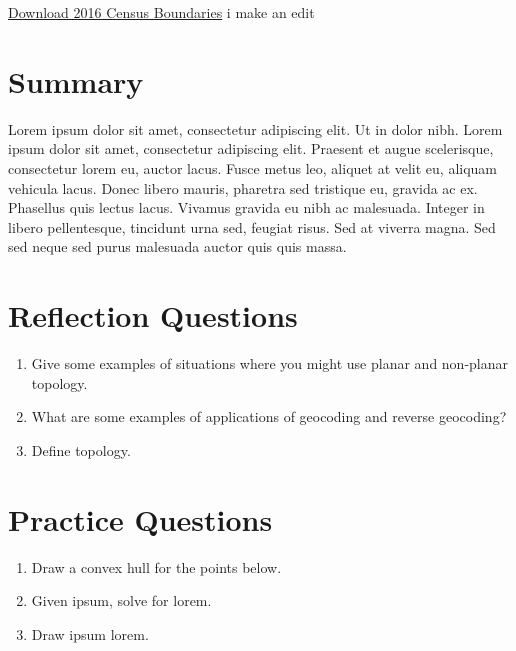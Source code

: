 \documentclass[
]{book}
\providecommand{\tightlist}{%
  \setlength{\itemsep}{0pt}\setlength{\parskip}{0pt}}
\begin{document}
\href{https://www12.statcan.gc.ca/census-recensement/2011/geo/bound-limit/bound-limit-2016-eng.cfm}{Download 2016 Census Boundaries} i make an edit

\hypertarget{summary-7}{%
\section{Summary}\label{summary-7}}

Lorem ipsum dolor sit amet, consectetur adipiscing elit. Ut in dolor nibh. Lorem ipsum dolor sit amet, consectetur adipiscing elit. Praesent et augue scelerisque, consectetur lorem eu, auctor lacus. Fusce metus leo, aliquet at velit eu, aliquam vehicula lacus. Donec libero mauris, pharetra sed tristique eu, gravida ac ex. Phasellus quis lectus lacus. Vivamus gravida eu nibh ac malesuada. Integer in libero pellentesque, tincidunt urna sed, feugiat risus. Sed at viverra magna. Sed sed neque sed purus malesuada auctor quis quis massa.

\hypertarget{reflection-questions-5}{%
\section*{Reflection Questions}\label{reflection-questions-5}}

\begin{enumerate}
\def\labelenumi{\arabic{enumi}.}
\tightlist
\item
  Give some examples of situations where you might use planar and non-planar topology.
\item
  What are some examples of applications of geocoding and reverse geocoding?
\item
  Define topology.
\end{enumerate}

\hypertarget{practice-questions-5}{%
\section*{Practice Questions}\label{practice-questions-5}}

\begin{enumerate}
\def\labelenumi{\arabic{enumi}.}
\tightlist
\item
  Draw a convex hull for the points below.
\item
  Given ipsum, solve for lorem.
\item
  Draw ipsum lorem.
\end{enumerate}
\end{document}

